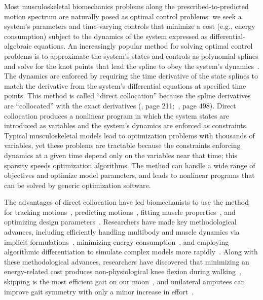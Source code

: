 \documentclass[10pt,letterpaper]{article}
\begin{document}
Most musculoskeletal biomechanics problems along the prescribed-to-predicted motion spectrum are naturally posed as optimal control problems: we seek a system’s parameters and time-varying controls that minimize a cost (e.g., energy consumption) subject to the dynamics of the system expressed as differential-algebraic equations. An increasingly popular method for solving optimal control problems is to approximate the system’s states and controls as polynomial splines and solve for the knot points that lead the spline to obey the system’s dynamics~\cite{Betts:2010,Umberger:2018ec,Mombaur:2016eb,Kelly:2017}. The dynamics are enforced by requiring the time derivative of the state splines to match the derivative from the system’s differential equations at specified time points. This method is called “direct collocation” because the spline derivatives are “collocated” with the exact derivatives (\cite{Hairer:1993}, page 211;~\cite{Hairer:1996}, page 498). Direct collocation produces a nonlinear program in which the system states are introduced as variables and the system’s dynamics are enforced as constraints. Typical musculoskeletal models lead to optimization problems with thousands of variables, yet these problems are tractable because the constraints enforcing dynamics at a given time depend only on the variables near that time; this sparsity speeds optimization algorithms. The method can handle a wide range of objectives and optimize model parameters, and leads to nonlinear programs that can be solved by generic optimization software.

The advantages of direct collocation have led biomechanists to use the method for tracking motions~\cite{Lin:2017jp,Mehrabi:2019}, predicting motions~\cite{Ackermann:2010dd,Miller:2015fc,Porsa:2015dn,Meyer:2016gl,Lee:2016dn,KMoore:2018ea,Lin:2018ex,Lai:2018,Nguyen:2019,Falisse:2019b}, fitting muscle properties~\cite{Falisse:2016}, and optimizing design parameters~\cite{Rohani:2017}. Researchers have made key methodological advances, including efficiently handling multibody and muscle dynamics via implicit formulations~\cite{vandenBogert:2011fv,Groote:2016dq}, minimizing energy consumption~\cite{Koelewijn:2018kw,Koelewijn:2019}, and employing algorithmic differentiation to simulate complex models more rapidly~\cite{Falisse:2019a}. Along with these methodological advances, researchers have discovered that minimizing an energy-related cost produces non-physiological knee flexion during walking~\cite{Ackermann:2010dd}, skipping is the most efficient gait on our moon~\cite{Ackermann:2012}, and unilateral amputees can improve gait symmetry with only a minor increase in effort~\cite{Koelewijn:2016bm}.
\end{document}
